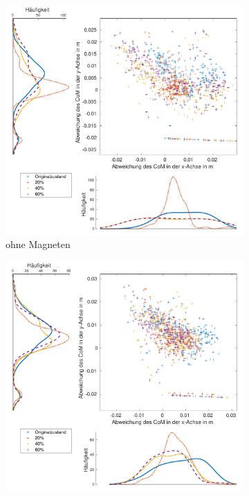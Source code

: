 \begin{figure}[tb]
	\centering
	\begin{adjustwidth}{-0.2\linewidth}{-0.2\linewidth}
		\hspace{40pt}
		\begin{subfigure}[c]{.45\linewidth}
			\centering
			\includegraphics[width=\linewidth]{Bilder/links_CoM_ohneM.pdf}
			\caption{ohne Magneten}
			\vspace{5pt}
		\end{subfigure}
		\hspace{-10pt}
		\begin{subfigure}[c]{.45\linewidth}
			\centering
			\includegraphics[width=\linewidth]{Bilder/links_CoM_mitM.pdf}

\end{subfigure}
\end{adjustwidth}
\end{figure}
